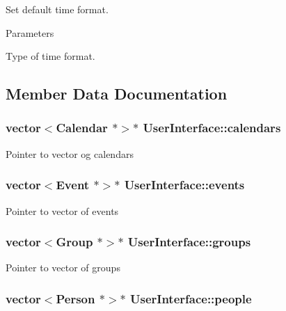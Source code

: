 \label{df/de1/classUserInterface_a36513fcf018fafc53726cf610f46571f}
Set default time format. 
\begin{DoxyParams}{Parameters}
\item[\mbox{\tt[in]} {\em format}]Type of time format. \end{DoxyParams}


\subsection{Member Data Documentation}
\hypertarget{classUserInterface_abd1f3233d3e666415f6cdf8458b50faa}{
\subsubsection[{calendars}]{\setlength{\rightskip}{0pt plus 5cm}vector$<${\bf Calendar} $\ast$$>$$\ast$ {\bf UserInterface::calendars}}}
\label{df/de1/classUserInterface_abd1f3233d3e666415f6cdf8458b50faa}
Pointer to vector og calendars \hypertarget{classUserInterface_ae3370dc0d02c19b4b1cc7c47221c2bfa}{
\subsubsection[{events}]{\setlength{\rightskip}{0pt plus 5cm}vector$<${\bf Event} $\ast$$>$$\ast$ {\bf UserInterface::events}}}
\label{df/de1/classUserInterface_ae3370dc0d02c19b4b1cc7c47221c2bfa}
Pointer to vector of events \hypertarget{classUserInterface_a12676e629660c43c63eb5b01c5c19bc3}{
\subsubsection[{groups}]{\setlength{\rightskip}{0pt plus 5cm}vector$<${\bf Group} $\ast$$>$$\ast$ {\bf UserInterface::groups}}}
\label{df/de1/classUserInterface_a12676e629660c43c63eb5b01c5c19bc3}
Pointer to vector of groups \hypertarget{classUserInterface_a3d0914e9d2ba661bc3691397c695287e}{
\subsubsection[{people}]{\setlength{\rightskip}{0pt plus 5cm}vector$<${\bf Person} $\ast$$>$$\ast$ {\bf UserInterface::people}}}
